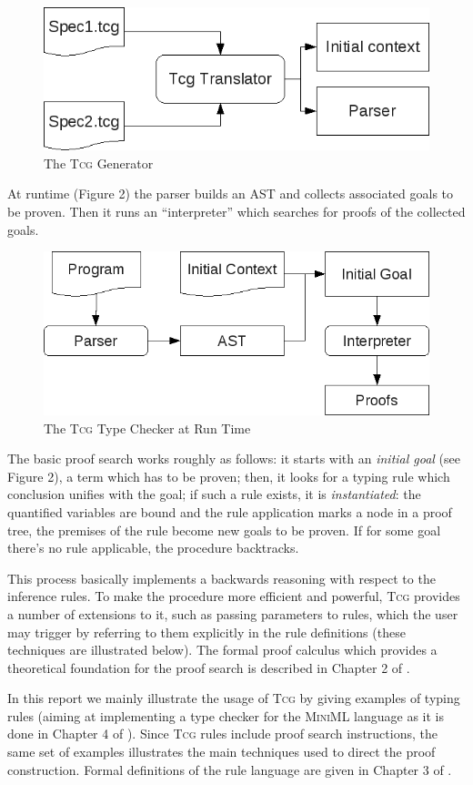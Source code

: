 \documentclass[a4paper,12pt]{article}
\newcommand{\Tcg}{\textsc{Tcg}}
\newcounter{premise}
\begin{document}
\begin{figure}[htp]
\centering
\includegraphics[width=.7\textwidth]{generator}
\caption{The \Tcg{} Generator}
\end{figure}

At runtime (Figure 2) the parser builds an AST and collects associated goals to be proven. Then it runs an ``interpreter'' which searches for proofs of the collected goals.

\begin{figure}[htp]
\centering
\includegraphics[width=.7\textwidth]{runtime}
\caption{The \Tcg{} Type Checker at Run Time}
\end{figure}

The basic proof search works roughly as follows: it starts with an \emph{initial goal} (see Figure 2), a term which has to be proven; then, it looks for a typing rule which conclusion unifies with the goal; if such a rule exists, it is \emph{instantiated}: the quantified variables are bound and the rule application marks a node in a proof tree, the premises of the rule become new goals to be proven. If for some goal there's no rule applicable, the procedure backtracks. 

This process basically implements a backwards reasoning with respect to the inference rules. To make the procedure more efficient and powerful, \Tcg{} provides a number of extensions to it, such as passing parameters to rules, which the user may trigger by referring to them explicitly in the rule definitions (these techniques are illustrated below). The formal proof calculus which provides a theoretical foundation for the proof search is described in Chapter 2 of \cite{Tcg}.

In this report we mainly illustrate the usage of \Tcg{} by giving examples of typing rules (aiming at implementing a type checker for the \textsc{MiniML} language \cite{MiniML} as it is done in Chapter 4 of \cite{Tcg}).
Since \Tcg{} rules include proof search instructions, the same set of examples illustrates the main techniques used to direct the proof construction. Formal definitions of the rule language are given in Chapter 3 of \cite{Tcg}.
\end{document}
